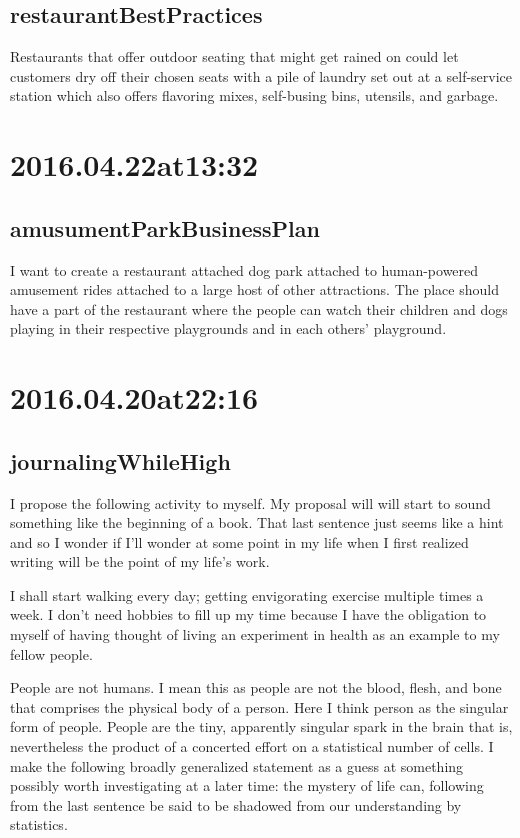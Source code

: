 \begin{enumerate}
\subsection*{restaurantBestPractices}
Restaurants that offer outdoor seating that might get rained on could let customers dry off their chosen seats with a pile of laundry set out at a self-service station which also offers flavoring mixes, self-busing bins, utensils, and garbage.

\section*{ 2016.04.22at13:32 }
\subsection*{amusumentParkBusinessPlan}
I want to create a restaurant attached dog park attached to human-powered amusement rides attached to a large host of other attractions. The place should have a part of the restaurant where the people can watch their children and dogs playing in their respective playgrounds and in each others' playground. 

\section*{ 2016.04.20at22:16 }
\subsection*{journalingWhileHigh}
I propose the following activity to myself. My proposal will will start to sound something like the beginning of a book. That last sentence just seems like a hint and so I wonder if I'll wonder at some point in my life when I first realized writing will be the point of my life's work.

I shall start walking every day; getting envigorating exercise multiple times a week. I don't need hobbies to fill up my time because I have the obligation to myself of having thought of living an experiment in health as an example to my fellow people.

People are not humans. I mean this as people are not the blood, flesh, and bone that comprises the physical body of a person. Here I think person as the singular form of people. People are the tiny, apparently singular spark in the brain that is, nevertheless the product of a concerted effort on a statistical number of cells. I make the following broadly generalized statement as a guess at something possibly worth investigating at a later time: the mystery of life can, following from the last sentence be said to be shadowed from our understanding by statistics.


\end{enumerate}
